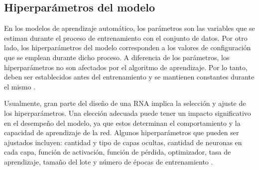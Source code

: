 \subsection{Hiperparámetros del modelo}
En los modelos de aprendizaje automático, los parámetros son las variables que se estiman durante el 
proceso de entrenamiento con el conjunto de datos. Por otro lado, los hiperparámetros del modelo 
corresponden a los valores de configuración que se emplean durante dicho proceso. A diferencia de 
los parámetros, los hiperparámetros no son afectados por el algoritmo de aprendizaje. Por lo tanto, 
deben ser establecidos antes del entrenamiento y se mantienen constantes durante el mismo \citep{CITE:44}.

Usualmente, gran parte del diseño de una RNA implica la selección y ajuste de los hiperparámetros. 
Una elección adecuada puede tener un impacto significativo en el desempeño del modelo, ya que estos 
determinan el comportamiento y la capacidad de aprendizaje de la red. Algunos hiperparámetros 
que pueden ser ajustados incluyen: cantidad y tipo de capas ocultas, cantidad de neuronas en cada capa,
función de activación, función de pérdida, optimizador, tasa de aprendizaje, tamaño del lote y
número de épocas de entrenamiento \citep{CITE:35} \citep{CITE:42} \citep{CITE:44}.


